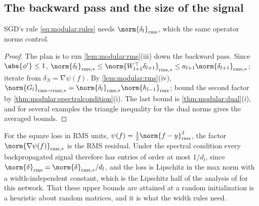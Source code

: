 \begin{refsection}
\subsection{The backward pass and the size of the signal}

SGD's rule \eqref{eq:modular:rules} needs $\norm{\delta_l}_\rms$, which the same operator norms control.


\begin{proof}
The plan is to run \cref{lem:modular:rms}(iii) down the backward pass. Since $\abs{\phi'}\le1$, $\norm{\delta_l}_{\rms,*}\le\norm{W_{l+1}^\top\delta_{l+1}}_{\rms,*}\le a_{l+1}\norm{\delta_{l+1}}_{\rms,*}$; iterate from $\delta_N=\nabla\psi(f)$. By \cref{lem:modular:rms}(iv), $\norm{G_l}_{\rms\to\rms,*}=\norm{\delta_l}_{\rms,*}\norm{h_{l-1}}_\rms$; bound the second factor by \cref{thm:modular:spectralcondition}(i). The last bound is \cref{thm:modular:dual}(i), and for several examples the triangle inequality for the dual norms gives the averaged bounds.
\end{proof}

For the square loss in RMS units, $\psi(f)=\frac12\norm{f-y}_\rms^2$, the factor $\norm{\nabla\psi(f)}_{\rms,*}$ is the RMS residual. Under the spectral condition every backpropagated signal therefore has entries of order at most $1/d_l$, since $\norm{\delta}_\rms=\norm{\delta}_{\rms,*}/d_l$, and the loss is Lipschitz in the max norm with a width-independent constant, which is the Lipschitz half of the analysis of \textcite{LargeEtAl2024} for this network. That these upper bounds are attained at a random initialization is a heuristic about random matrices, and it is what the width rules need.


\end{refsection}
